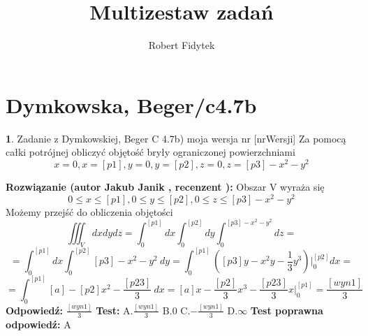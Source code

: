 \documentclass[12pt, a4paper]{article}
\title{Multizestaw zadań}
\author{Robert Fidytek}
\date{}
\theoremstyle{definition} %
\newtheorem{zad}{}
\newcommand{\kategoria}[1]{\section{#1}} %
\newcommand{\zadStart}[1]{\begin{zad}#1\newline} %
\newcommand{\zadStop}{\end{zad}}   %
\newcommand{\rozwStart}[2]{\noindent \textbf{Rozwiązanie (autor #1 , recenzent #2): }\newline} %
\newcommand{\rozwStop}{\newline}                                            %
\newcommand{\odpStart}{\noindent \textbf{Odpowiedź:}\newline}    %
\newcommand{\odpStop}{\newline}                                             %
\newcommand{\testStart}{\noindent \textbf{Test:}\newline} %
\newcommand{\testStop}{\newline} %
\newcommand{\kluczStart}{\noindent \textbf{Test poprawna odpowiedź:}\newline} %
\newcommand{\kluczStop}{\newline} %
\begin{document}
\maketitle


\kategoria{Dymkowska, Beger/c4.7b}
\zadStart{Zadanie z Dymkowskiej, Beger C 4.7b) moja wersja nr [nrWersji]}
Za pomocą całki potrójnej obliczyć objętość bryły ograniczonej powierzchniami
$$x=0, x=[p1], y=0, y=[p2], z=0, z=[p3]-x^2-y^2$$
\zadStop
\rozwStart{Jakub Janik}{}
Obszar V wyraża się $$0 \leq x \leq [p1], 0 \leq y \leq [p2], 0 \leq z \leq [p3]-x^2-y^2$$
Możemy przejść do obliczenia objętości
$$\iiint_V dxdydz=\int_0^{[p1]}dx\int_0^{[p2]}dy\int_0^{[p3]-x^2-y^2}dz=$$
$$=\int_0^{[p1]}dx\int_0^{[p2]}[p3]-x^2-y^2\ dy=\int_0^{[p1]}([p3]y-x^2y-\frac{1}{3}y^3)\Big|_0^{[p2]}dx=$$
$$=\int_0^{[p1]}[a]-[p2]x^2-\frac{[p23]}{3}\ dx=[a]x-\frac{[p2]}{3}x^3-\frac{[p23]}{3}x\Big|_0^{[p1]}=\frac{[wyn1]}{3}$$
\rozwStop
\odpStart
$\frac{[wyn1]}{3}$
\odpStop
\testStart
A.$\frac{[wyn1]}{3}$
B.$0$
C.$-\frac{[wyn1]}{3}$
D.$\infty$
\testStop
\kluczStart
A
\kluczStop
\end{document}
